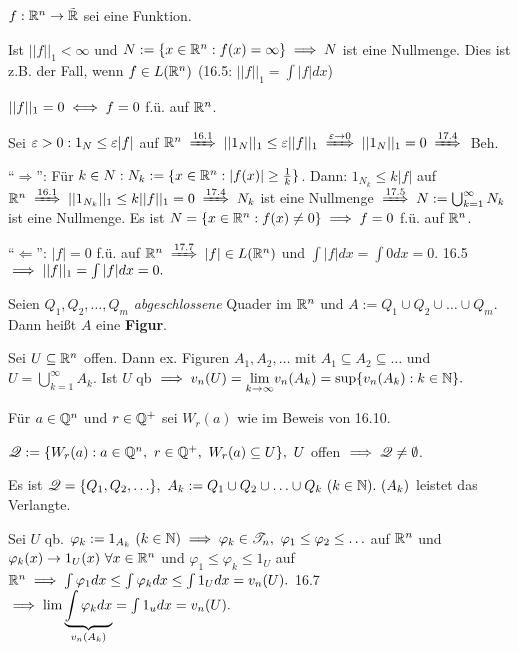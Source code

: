 \documentclass[a4paper,twoside,DIV15,BCOR12mm]{scrbook}
\begin{document}
\begin{satz}
$f:\mathbb{R}^n\to\tilde{\mathbb{R}}$ sei eine Funktion.
\begin{liste}
\item Ist $||f||_1<\infty$ und $N:=\{x\in\mathbb{R}^n:f(x)=\infty\} \implies N$ ist eine Nullmenge. Dies ist z.B. der Fall, wenn $f\in L(\mathbb{R}^n)$ (16.5: $||f||_1 = \int|f|dx$)

\item $||f||_1=0\iff f=0$ f.ü. auf $\mathbb{R}^n$.
\end{liste}
\end{satz}

\begin{beweis}
\begin{liste}
\item Sei $\varepsilon>0: 1_N\le\varepsilon|f|$ auf $\MdR^n \folgtnach{16.1} ||1_N||_1 \le \ep||f||_1 \folgtwegen{\ep\to0} ||1_N||_1=0 \folgtnach{17.4}$ Beh.
\item "`$\Rightarrow$"': Für $k\in N:N_k := \{x\in\mathbb{R}^n:|f(x)|\ge \frac{1}{k}\}$. Dann: $1_{N_k}\le k|f|$ auf $\MdR^n \folgtnach{16.1} ||1_{N_k}||_1\le k||f||_1=0 \folgtnach{17.4} N_k$ ist eine Nullmenge $\folgtnach{17.5} N:= \bigcup_{k=1}^\infty N_k$ ist eine Nullmenge. Es ist $N=\{x\in\mathbb{R}^n:f(x)\ne0\} \implies f=0$ f.ü. auf $\mathbb{R}^n$.

"`$\Leftarrow$"': $|f|=0$ f.ü. auf $\MdR^n \folgtnach{17.7} |f|\in L(\MdR^n)$ und $\int|f|dx = \int0dx = 0.$ 16.5 $\implies ||f||_1 = \int|f|dx = 0.$
\end{liste}
\end{beweis}

\begin{definition}
Seien $Q_1,Q_2,\ldots,Q_m$ \emph{abgeschlossene} Quader im $\mathbb{R}^n$ und $A:=Q_1\cup Q_2\cup\ldots\cup Q_m.$ Dann heißt $A$ eine \textbf{Figur}.
\end{definition}

\begin{satz}
Sei $U\subseteq\mathbb{R}^n$ offen. Dann ex. Figuren $A_1,A_2,\ldots$ mit $A_1\subseteq A_2\subseteq \ldots$ und $U=\bigcup_{k=1}^\infty A_k$. Ist $U$ qb $\implies v_n(U) = \displaystyle{\lim_{k\to\infty}}v_n(A_k) = \sup\{v_n(A_k):k\in\mathbb{N}\}.$
\end{satz}

\def\Q{\ensuremath{\mathscr{Q}}}

\begin{beweis}
Für $a\in\mathbb{Q}^n$ und $r\in\mathbb{Q}^+$ sei $W_r(a)$ wie im Beweis von 16.10.

$\Q:=\{W_r(a):a\in\MdQ^n,\ r\in\MdQ^+,\ W_r(a)\subseteq U\},\ U$ offen $\folgt \Q\ne\emptyset$.

Es ist $\Q=\{Q_1,Q_2,\ldots\},\ A_k:=Q_1\cup Q_2\cup\ldots\cup Q_k\ (k\in\MdN).\ (A_k)$ leistet das Verlangte.

Sei $U$ qb. $\varphi_k:=1_{A_k}\ (k\in\mathbb{N}) \implies \varphi_k\in\mathscr{T}_n,\ \varphi_1\le\varphi_2\le\ldots$ auf $\mathbb{R}^n$ und $\varphi_k(x)\to1_U(x)\ \forall x\in\mathbb{R}^n$ und $\varphi_1\le\varphi_k\le1_U$ auf $\mathbb{R}^n \implies \int\varphi_1dx\le\int\varphi_kdx\le\int1_Udx=v_n(U).$ 16.7 $\implies \lim\underbrace{\int\varphi_kdx}_{v_n(A_k)} = \int1_udx = v_n(U).$
\end{beweis}
\end{document}

